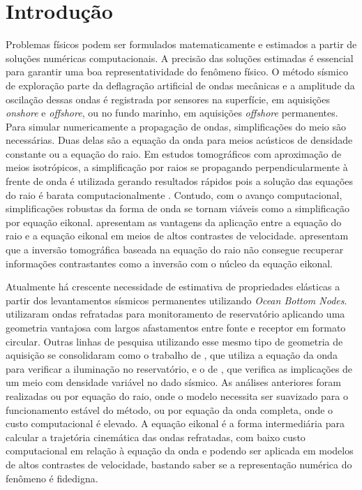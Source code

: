 \chapter{Introdução}
\label{ch:introducao}

Problemas físicos podem ser formulados matematicamente e estimados a partir de soluções numéricas computacionais. A precisão das soluções estimadas é essencial para garantir uma boa representatividade do fenômeno físico. O método sísmico de exploração parte da deflagração artificial de ondas mecânicas e a amplitude da oscilação dessas ondas é registrada por sensores na superfície, em aquisições \textit{onshore} e \textit{offshore}, ou no fundo marinho, em aquisições \textit{offshore} permanentes. Para simular numericamente a propagação de ondas, simplificações do meio são necessárias. Duas delas são a equação da onda para meios acústicos de densidade constante ou a equação do raio. Em estudos tomográficos com aproximação de meios isotrópicos, a simplificação por raios se propagando perpendicularmente à frente de onda é utilizada gerando resultados rápidos pois a solução das equações do raio é barata computacionalmente \cite{zhang1998nonlinear}. Contudo, com o avanço computacional, simplificações robustas da forma de onda se tornam viáveis como a simplificação por equação eikonal.  apresentam as vantagens da aplicação entre a equação do raio e a equação eikonal em meios de altos contrastes de velocidade.  apresentam que a inversão tomográfica baseada na equação do raio não consegue recuperar informações contrastantes como a inversão com o núcleo da equação eikonal.  

Atualmente há crescente necessidade de estimativa de propriedades elásticas a partir dos levantamentos sísmicos permanentes utilizando \textit{Ocean Bottom Nodes}.  utilizaram ondas refratadas para monitoramento de reservatório aplicando uma geometria vantajosa com largos afastamentos entre fonte e receptor em formato circular. Outras linhas de pesquisa utilizando esse mesmo tipo de geometria de aquisição se consolidaram como o trabalho de , que utiliza a equação da onda para verificar a iluminação no reservatório, e o de , que verifica as implicações de um meio com densidade variável no dado sísmico. As análises anteriores foram realizadas ou por equação do raio, onde o modelo necessita ser suavizado para o funcionamento estável do método, ou por equação da onda completa, onde o custo computacional é elevado. A equação eikonal é a forma intermediária para calcular a trajetória cinemática das ondas refratadas, com baixo custo computacional em relação à equação da onda e podendo ser aplicada em modelos de altos contrastes de velocidade, bastando saber se a representação numérica do fenômeno é fidedigna. 

